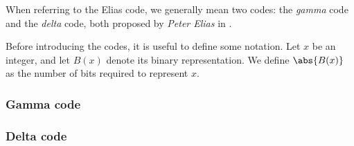 \documentclass{subfiles}
\begin{document}
    When referring to the Elias code, we generally mean two codes: the 
    \emph{gamma} code and the \emph{delta} code, both proposed by 
    \emph{Peter Elias} in \cite{elias1975}.

    Before introducing the codes, it is useful to define some notation. 
    Let \(x\) be an integer, and let \(B(x)\) denote its binary representation. 
    We define \(\abs{B(x)}\) as the number of bits required to represent \(x\). 

    \subsubsection{Gamma code}
    

    \subsubsection{Delta code}
    
    \clearpage
\end{document}
